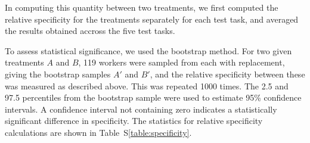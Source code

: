 \documentclass[12pt]{article}
\begin{document}
In computing this quantity between two treatments, we first computed the 
relative specificity for the treatments separately for each test task, and 
averaged the results obtained accross the five test tasks.

To assess statistical significance, we used the bootstrap method.
For two given treatments $A$ and $B$, 
119 workers were sampled from each with replacement, giving the bootstrap
samples $A'$ and $B'$, and the relative specificity between these 
was measured as described above.
This was repeated 1000 times.  The 2.5 and 97.5 percentiles from the 
bootstrap sample were used to estimate 95\% confidence intervals.  
A confidence interval not containing zero indicates a statistically 
significant difference in specificity.  
The statistics for relative specificity 
calculations are shown in Table~S\ref{table:specificity}.

\begin{table}
\caption{Relative specificity ($S$) of food-related words between the food- 
	and non-food-exposed treatments of all experiments. 
	Positive values indicates the food-exposed treatment was relatively more
	specific (which was always the case); 
	boldfaced values indicate a disparity in specificity that 
	is statistically significant.  
	$S^*_\mathrm{lowCI}, S^*_\mathrm{highCI}$: lower and upper
	confidence intervals for $S$ based on the bootstrapping approach.  
	Specificites are expressed as percentages.}
\label{table:specificity}
\end{table}
\end{document}
